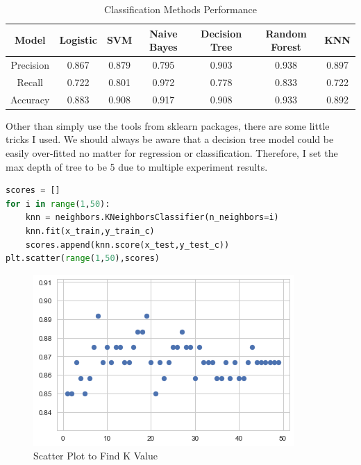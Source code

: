\documentclass[12pt]{article}
\begin{document}
\begin{sloppypar}
\begin{table}[H]
\centering
\begin{tabular}{|c|c|c|c|c|c|c|}
\hline
Model     & Logistic & SVM   & Naive Bayes & Decision Tree & Random Forest & KNN   \\ \hline
Precision & 0.867    & 0.879 & 0.795       & 0.903         & 0.938         & 0.897 \\ \hline
Recall    & 0.722    & 0.801 & 0.972       & 0.778         & 0.833         & 0.722 \\ \hline
Accuracy  & 0.883    & 0.908 & 0.917       & 0.908         & 0.933         & 0.892 \\ \hline
\end{tabular}
\caption{Classification Methods Performance}
\end{table}
Other than simply use the tools from sklearn packages, there are some little tricks I used. We should always be aware that a decision tree model could be easily over-fitted no matter for regression or classification. Therefore, I set the max depth of tree to be 5 due to multiple experiment results.\\
\begin{lstlisting}[language = Python,frame=shadowbox]
scores = []
for i in range(1,50):
    knn = neighbors.KNeighborsClassifier(n_neighbors=i)
    knn.fit(x_train,y_train_c)
    scores.append(knn.score(x_test,y_test_c))
plt.scatter(range(1,50),scores)
\end{lstlisting}

\begin{figure}[H]
    \centering
    \includegraphics[scale = 0.75]{K_neighbors.png}
    \caption{Scatter Plot to Find K Value}
\end{figure}


\end{sloppypar}
\end{document}
